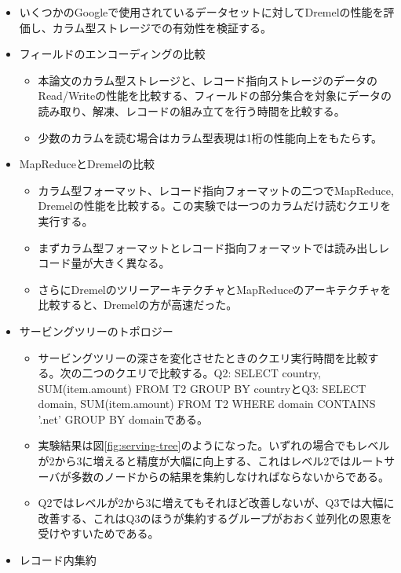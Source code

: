 \documentclass[dvipdfmx,uplatex]{jsarticle}
\theoremstyle{remark}
\newenvironment{experiment}[1]{
    \begin{tcolorbox}[
        colframe=violet,
        colback=violet!10!white,
        colbacktitle=violet!40!white,
        coltitle=black,
        fonttitle=\bfseries,
        title={#1}
    ]
}{
    \end{tcolorbox}
}
\begin{document}
\begin{experiment}{実験結果}
\begin{itemize}
    \item いくつかのGoogleで使用されているデータセットに対してDremelの性能を評価し、カラム型ストレージでの有効性を検証する。
    \item フィールドのエンコーディングの比較
    \begin{itemize}
        \item 本論文のカラム型ストレージと、レコード指向ストレージのデータのRead/Writeの性能を比較する、フィールドの部分集合を対象にデータの読み取り、解凍、レコードの組み立てを行う時間を比較する。
        \item 少数のカラムを読む場合はカラム型表現は1桁の性能向上をもたらす。
    \end{itemize}
    \item MapReduceとDremelの比較
    \begin{itemize}
        \item カラム型フォーマット、レコード指向フォーマットの二つでMapReduce, Dremelの性能を比較する。この実験では一つのカラムだけ読むクエリを実行する。
        \item まずカラム型フォーマットとレコード指向フォーマットでは読み出しレコード量が大きく異なる。
        \item さらにDremelのツリーアーキテクチャとMapReduceのアーキテクチャを比較すると、Dremelの方が高速だった。
    \end{itemize}
    \item サービングツリーのトポロジー
    \begin{itemize}
        \item サービングツリーの深さを変化させたときのクエリ実行時間を比較する。次の二つのクエリで比較する。Q2: SELECT country, SUM(item.amount) FROM T2 GROUP BY countryとQ3: SELECT domain, SUM(item.amount) FROM T2 WHERE domain CONTAINS '.net' GROUP BY domainである。
        \item 実験結果は図\ref{fig:serving-tree}のようになった。いずれの場合でもレベルが2から3に増えると精度が大幅に向上する、これはレベル2ではルートサーバが多数のノードからの結果を集約しなければならないからである。
        \item Q2ではレベルが2から3に増えてもそれほど改善しないが、Q3では大幅に改善する、これはQ3のほうが集約するグループがおおく並列化の恩恵を受けやすいためである。
    \end{itemize}
    \item レコード内集約
    \begin{itemize}

\end{itemize}
\end{itemize}
\end{experiment}
\end{document}
